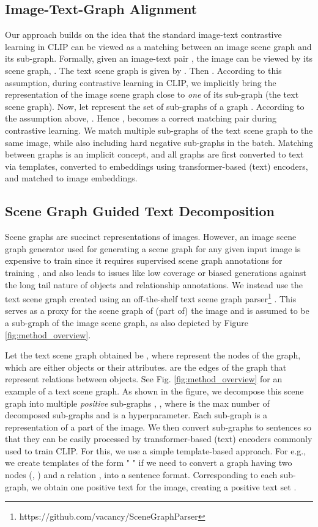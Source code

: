 \documentclass[11pt]{article}
\begin{document}
\subsection{Image-Text-Graph Alignment}
\label{subsec_itg_alignment}
Our approach builds on the idea that the standard image-text contrastive learning in CLIP can be viewed as a matching between an image scene graph and its sub-graph. Formally, given an image-text pair , the image can be viewed by its scene graph, . The text scene graph is given by . Then . According to this assumption, during contrastive learning in CLIP, we implicitly bring the representation of the image scene graph close to \textit{one} of its sub-graph (the text scene graph).
Now, let  represent the set of sub-graphs of a graph . According to the assumption above, . Hence ,  becomes a correct matching pair during contrastive learning.
We match multiple sub-graphs of the text scene graph to the same image, while also including hard negative sub-graphs in the batch. Matching between graphs is an implicit concept, and all graphs are first converted to text via templates, converted to embeddings using transformer-based (text) encoders, and matched to image embeddings.


\subsection{Scene Graph Guided Text Decomposition}
\label{subsec_sg_decomposition}
Scene graphs are succinct representations of images. However, an image scene graph generator used for generating a scene graph for any given input image is expensive to train since it requires supervised scene graph annotations for training \citep{li2017scene, xu2017scene, zhang2019graphical}, and also leads to issues like low coverage or biased generations against the long tail nature of objects and relationship annotations. We instead use the text scene graph created using an off-the-shelf text scene graph parser\footnote{https://github.com/vacancy/SceneGraphParser} \citep{wu2019unified}. This serves as a proxy for the scene graph of (part of) the image and is assumed to be a sub-graph of the image scene graph, as also depicted by Figure \ref{fig:method_overview}.

Let the text scene graph obtained be , where  represent the nodes of the graph, which are either objects or their attributes.  are the edges of the graph that represent relations between objects. See Fig. \ref{fig:method_overview} for an example of a text scene graph. As shown in the figure, we decompose this scene graph into multiple \textit{positive} sub-graphs , , where  is the max number of decomposed sub-graphs and is a hyperparameter. Each sub-graph is a representation of a part of the image. We then convert sub-graphs to sentences so that they can be easily processed by transformer-based (text) encoders commonly used to train CLIP. For this, we use a simple template-based approach. For e.g., we create templates of the form "  " if we need to convert a graph having two nodes (, ) and a relation , into a sentence format. Corresponding to each sub-graph, we obtain one positive text for the image, creating a positive text set .
\end{document}
